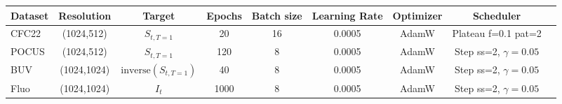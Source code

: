 \vspace{0pt} %
\begin{tabular}{l c c c c c c c c}
\toprule
Dataset & Resolution & Target & Epochs & Batch size & Learning Rate & Optimizer & Scheduler \\
\hline
CFC22 & (1024,512) & $S_{t,T=1}$ & 20 & 16 & 0.0005 & AdamW & Plateau f=0.1 pat=2 \\
POCUS & (1024,512) & $S_{t,T=1}$ & 120 & 8 & 0.0005 & AdamW & Step ss=2, $\gamma=0.05$\\
BUV & (1024,1024) & ${\text{inverse}(S_{t,T=1})}$ & 40 & 8 & 0.0005 & AdamW & Step ss=2, $\gamma=0.05$\\
Fluo & (1024,1024) & $I_t$ & 1000 & 8 & 0.0005 & AdamW & Step ss=2, $\gamma=0.05$\\
\bottomrule
\end{tabular}